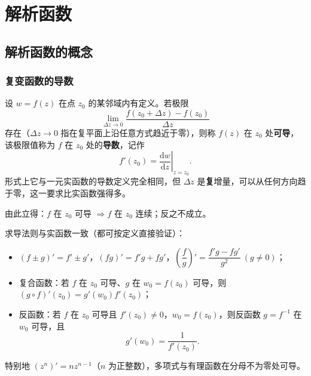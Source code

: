 
\chapter{解析函数}

\section{解析函数的概念}

\subsection{复变函数的导数}
设 \(w=f(z)\) 在点 \(z_{0}\) 的某邻域内有定义。若极限
\[
\lim_{\Delta z\to 0}\frac{f(z_{0}+\Delta z)-f(z_{0})}{\Delta z}
\]
存在（\(\Delta z\to 0\) 指在复平面上沿任意方式趋近于零），则称 \(f(z)\) 在 \(z_{0}\) 处\textbf{可导}，该极限值称为 \(f\) 在 \(z_{0}\) 处的\textbf{导数}，记作
\[
f'(z_{0})=\left.\frac{\mathrm{d}w}{\mathrm{d}z}\right|_{z=z_{0}}.
\]
形式上它与一元实函数的导数定义完全相同，但 \(\Delta z\) 是\textbf{复}增量，可以从任何方向趋于零，这一要求比实函数强得多。

由此立得：\(f\) 在 \(z_{0}\) 可导 \(\Rightarrow f\) 在 \(z_{0}\) 连续；反之不成立。

求导法则与实函数一致（都可按定义直接验证）：
\begin{itemize}[leftmargin=2em]
  \item \((f\pm g)'=f'\pm g'\)，\((fg)'=f'g+fg'\)，\(\left(\dfrac{f}{g}\right)'=\dfrac{f'g-fg'}{g^{2}}\ (g\neq 0)\)；
  \item 复合函数：若 \(f\) 在 \(z_{0}\) 可导、\(g\) 在 \(w_{0}=f(z_{0})\) 可导，则 \((g\circ f)'(z_{0})=g'(w_{0})f'(z_{0})\)；
  \item 反函数：若 \(f\) 在 \(z_{0}\) 可导且 \(f'(z_{0})\neq 0\)，\(w_{0}=f(z_{0})\)，则反函数 \(g=f^{-1}\) 在 \(w_{0}\) 可导，且
  \[
  g'(w_{0})=\frac{1}{f'(z_{0})}.
  \]
\end{itemize}
特别地 \((z^{n})'=nz^{n-1}\)（\(n\) 为正整数），多项式与有理函数在分母不为零处可导。


